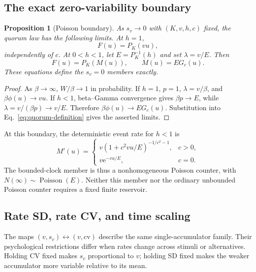 \documentclass[12pt]{article}
\newcommand{\e}{\mathrm{e}}
\newcommand{\Poisson}{\operatorname{Poisson}}
\theoremstyle{definition}
\theoremstyle{plain}
\newtheorem{proposition}{Proposition}
\theoremstyle{remark}
\begin{document}
\subsection{The exact zero-variability boundary}\label{sec:zero}
\begin{proposition}[Poisson boundary]
As $s_v\to0$ with $(K,v,h,c)$ fixed, the quorum law has the following limits. At $h=1$,
\begin{equation}
 F(u)=P_K(vu),\label{eq:zero-proper}
\end{equation}
independently of $c$. At $0<h<1$, let $E=P_K^{-1}(h)$ and set $\lambda=v/E$. Then
\begin{equation}
 F(u)=P_K(M(u)),\qquad M(u)=E G_c(u).\label{eq:zero-defective}
\end{equation}
These equations define the $s_v=0$ members exactly.
\end{proposition}
\begin{proof}
As $\beta\to\infty$, $W/\beta\to1$ in probability. If $h=1$, $p=1$, $\lambda=v/\beta$, and $\beta\phi(u)\to vu$. If $h<1$, beta--Gamma convergence gives $\beta p\to E$, while $\lambda=v/(\beta p)\to v/E$. Therefore $\beta\phi(u)\to E G_c(u)$. Substitution into Eq.~\eqref{eq:quorum-definition} gives the asserted limits.
\end{proof}
At this boundary, the deterministic event rate for $h<1$ is
\begin{equation}
 M'(u)=
 \begin{cases}
 v(1+c^2vu/E)^{-1/c^2-1},&c>0,\\
 v\e^{-vu/E},&c=0.
 \end{cases}\label{eq:zero-rate}
\end{equation}
The bounded-clock member is thus a nonhomogeneous Poisson counter, with $N(\infty)\sim\Poisson(E)$. Neither this member nor the ordinary unbounded Poisson counter requires a fixed finite reservoir.

\subsection{Rate SD, rate CV, and time scaling}\label{sec:scale}
The maps $(v,s_v)\leftrightarrow(v,\mathrm{cv})$ describe the same single-accumulator family. Their psychological restrictions differ when rates change across stimuli or alternatives. Holding CV fixed makes $s_v$ proportional to $v$; holding SD fixed makes the weaker accumulator more variable relative to its mean.
\end{document}
